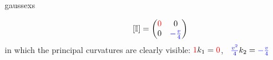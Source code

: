 \begin{examples}{}{gaussexs}
\begin{enumerate}
\begin{align*}
	  	\qquad
	  	[\mathbb{I}]
			=
			\begin{pmatrix}
	  		\textcolor{red}{0}&0\\
	  		0&\textcolor{blue}{-\frac{v}4}
	  	\end{pmatrix}
	  \end{align*}
	  in which the principal curvatures are clearly visible: $\textcolor{red}{1}k_1=\textcolor{red}{0}$, \ $\textcolor{blue}{\frac{v^2}4}k_2 =\textcolor{blue}{-\frac{v}4}$
	\end{enumerate}
\end{examples}



